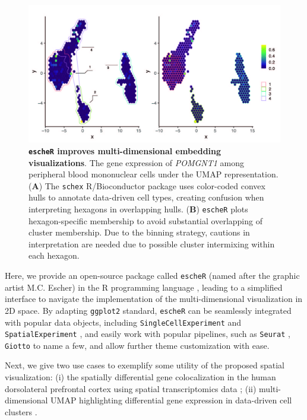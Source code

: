 \documentclass[10pt,twocolumn]{article}
\begin{document}
\begin{figure}[t]
\begin{center}
\includegraphics[width=\textwidth]{Manuscript/figure/embedding.jpg}
\caption{\small \textbf{\texttt{escheR} improves multi-dimensional embedding visualizations}. The gene expression of \textit{POMGNT1} among peripheral blood mononuclear cells \cite{PBMC} under the UMAP representation. (\textbf{A}) The \texttt{schex} R/Bioconductor package uses color-coded convex hulls to annotate data-driven cell types, creating confusion when interpreting hexagons in overlapping hulls. (\textbf{B}) \texttt{escheR} plots hexagon-specific membership to avoid substantial overlapping of cluster membership. Due to the binning strategy, cautions in interpretation are needed due to possible cluster intermixing within each hexagon.} 
\label{fig:embedding} 
\end{center}
\vspace{-0.3in}
\end{figure}

Here, we provide an open-source package called \texttt{escheR} (named after the graphic artist M.C. Escher) in the R programming language \cite{R}, leading to a simplified interface to navigate the implementation of the multi-dimensional visualization in 2D space. By adapting \texttt{ggplot2} standard, \texttt{escheR} can be seamlessly integrated with popular data objects, including \texttt{SingleCellExperiment} \cite{amezquita2020} and \texttt{SpatialExperiment} \cite{righelli2022}, and easily work with popular pipelines, such as \texttt{Seurat} \cite{hao_2021}, \texttt{Giotto} \cite{dries_2021} to name a few, and allow further theme customization with ease.

Next, we give two use cases to exemplify some utility of the proposed spatial visualization: (i) the spatially differential gene colocalization in the human dorsolateral prefrontal cortex using spatial transcriptomics data \cite{huukimyers_2023}; (ii) multi-dimensional UMAP highlighting differential gene expression in data-driven cell clusters \cite{freytag_2020}. 
\end{document}
